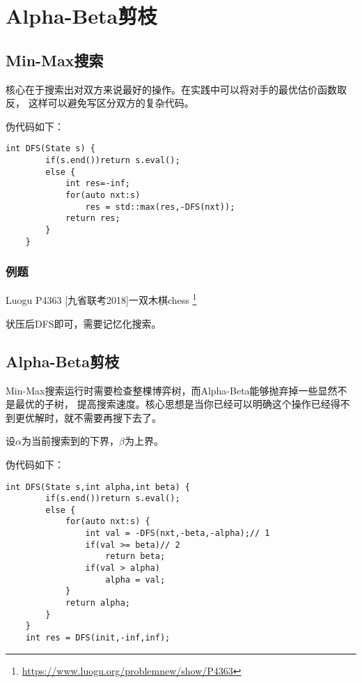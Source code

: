 \section{Alpha-Beta剪枝}
\subsection{Min-Max搜索}

核心在于搜索出对双方来说最好的操作。在实践中可以将对手的最优估价函数取反，
这样可以避免写区分双方的复杂代码。

伪代码如下：
\begin{lstlisting}[title=Min-Max Search]
    int DFS(State s) {
        if(s.end())return s.eval();
        else {
            int res=-inf;
            for(auto nxt:s)
                res = std::max(res,-DFS(nxt));
            return res;
        }
    }
\end{lstlisting}

\subsubsection{例题}
Luogu P4363 [九省联考2018]一双木棋chess
\footnote{\url{https://www.luogu.org/problemnew/show/P4363}}

状压后DFS即可，需要记忆化搜索。



\subsection{Alpha-Beta剪枝}


Min-Max搜索运行时需要检查整棵博弈树，而Alpha-Beta能够抛弃掉一些显然不是最优的子树，
提高搜索速度。核心思想是当你已经可以明确这个操作已经得不到更优解时，就不需要再搜下去了。

设$\alpha$为当前搜索到的下界，$\beta$为上界。

伪代码如下：
\begin{lstlisting}[title=Alpha-Beta 剪枝]
    int DFS(State s,int alpha,int beta) {
        if(s.end())return s.eval();
        else {
            for(auto nxt:s) {
                int val = -DFS(nxt,-beta,-alpha);// 1
                if(val >= beta)// 2
                    return beta;
                if(val > alpha)
                    alpha = val;
            }
            return alpha;
        }
    }
    int res = DFS(init,-inf,inf);
\end{lstlisting}

